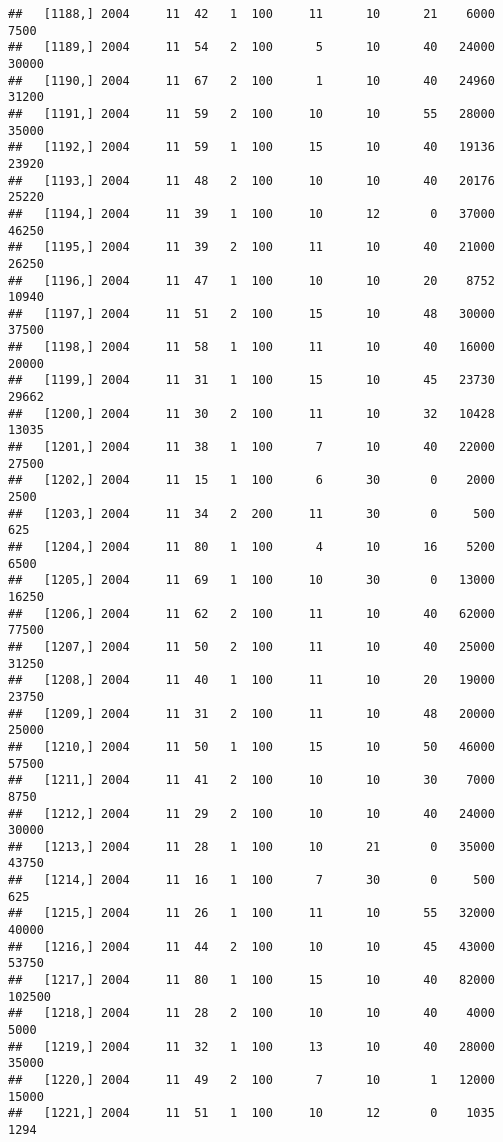 \documentclass{article}\usepackage[]{graphicx}\usepackage[]{color}
\makeatletter
\newenvironment{kframe}{%
 \def\at@end@of@kframe{}%
 \ifinner\ifhmode%
  \def\at@end@of@kframe{\end{minipage}}%
  \begin{minipage}{\columnwidth}%
 \fi\fi%
 \def\FrameCommand##1{\hskip\@totalleftmargin \hskip-\fboxsep
 \colorbox{shadecolor}{##1}\hskip-\fboxsep
     \hskip-\linewidth \hskip-\@totalleftmargin \hskip\columnwidth}%
 \MakeFramed {\advance\hsize-\width
   \@totalleftmargin\z@ \linewidth\hsize
   \@setminipage}}%
 {\par\unskip\endMakeFramed%
 \at@end@of@kframe}
\newenvironment{knitrout}{}{} %
\makeatother
\begin{document}
\begin{knitrout}
\begin{kframe}
\begin{verbatim}
##   [1188,] 2004     11  42   1  100     11      10      21    6000    7500
##   [1189,] 2004     11  54   2  100      5      10      40   24000   30000
##   [1190,] 2004     11  67   2  100      1      10      40   24960   31200
##   [1191,] 2004     11  59   2  100     10      10      55   28000   35000
##   [1192,] 2004     11  59   1  100     15      10      40   19136   23920
##   [1193,] 2004     11  48   2  100     10      10      40   20176   25220
##   [1194,] 2004     11  39   1  100     10      12       0   37000   46250
##   [1195,] 2004     11  39   2  100     11      10      40   21000   26250
##   [1196,] 2004     11  47   1  100     10      10      20    8752   10940
##   [1197,] 2004     11  51   2  100     15      10      48   30000   37500
##   [1198,] 2004     11  58   1  100     11      10      40   16000   20000
##   [1199,] 2004     11  31   1  100     15      10      45   23730   29662
##   [1200,] 2004     11  30   2  100     11      10      32   10428   13035
##   [1201,] 2004     11  38   1  100      7      10      40   22000   27500
##   [1202,] 2004     11  15   1  100      6      30       0    2000    2500
##   [1203,] 2004     11  34   2  200     11      30       0     500     625
##   [1204,] 2004     11  80   1  100      4      10      16    5200    6500
##   [1205,] 2004     11  69   1  100     10      30       0   13000   16250
##   [1206,] 2004     11  62   2  100     11      10      40   62000   77500
##   [1207,] 2004     11  50   2  100     11      10      40   25000   31250
##   [1208,] 2004     11  40   1  100     11      10      20   19000   23750
##   [1209,] 2004     11  31   2  100     11      10      48   20000   25000
##   [1210,] 2004     11  50   1  100     15      10      50   46000   57500
##   [1211,] 2004     11  41   2  100     10      10      30    7000    8750
##   [1212,] 2004     11  29   2  100     10      10      40   24000   30000
##   [1213,] 2004     11  28   1  100     10      21       0   35000   43750
##   [1214,] 2004     11  16   1  100      7      30       0     500     625
##   [1215,] 2004     11  26   1  100     11      10      55   32000   40000
##   [1216,] 2004     11  44   2  100     10      10      45   43000   53750
##   [1217,] 2004     11  80   1  100     15      10      40   82000  102500
##   [1218,] 2004     11  28   2  100     10      10      40    4000    5000
##   [1219,] 2004     11  32   1  100     13      10      40   28000   35000
##   [1220,] 2004     11  49   2  100      7      10       1   12000   15000
##   [1221,] 2004     11  51   1  100     10      12       0    1035    1294

\end{verbatim}
\end{kframe}
\end{knitrout}
\end{document}
